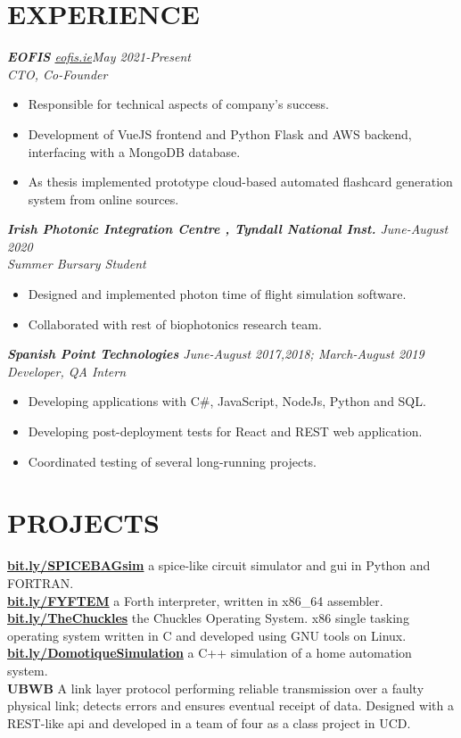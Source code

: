 \documentclass[sectionsleft,centered,10pt]{res}
\let\oldhref\href
\renewcommand{\href}[2]{\oldhref{#1}{\textbf{#2}}}
\begin{document}
\begin{resume}
\section{EXPERIENCE}
{\sl\textbf{EOFIS} \hspace{0.5cm}\oldhref{https://eofis.ie}{eofis.ie}\hfill May 2021-Present}\\
\emph{CTO, Co-Founder}
\begin{itemize}
	\item Responsible for technical aspects of company's success.
	\item Development of VueJS frontend and Python Flask and AWS backend, interfacing with a MongoDB database.
	\item As thesis implemented prototype cloud-based automated flashcard generation system from online sources.
\end{itemize}
{\sl\textbf{Irish Photonic Integration Centre , Tyndall National Inst.} \hfill June-August 2020}\\
\emph{Summer Bursary Student}
\begin{itemize}
	\item Designed and implemented photon time of flight simulation software.
	\item Collaborated with rest of biophotonics research team.
\end{itemize}
{\sl\textbf{Spanish Point Technologies} \hfill June-August 2017,2018; March-August 2019}\\
\emph{Developer, QA Intern}
\begin{itemize}
	\item Developing applications with C\#, JavaScript, NodeJs, Python and SQL.
	\item Developing post-deployment tests for React and REST web application.
	\item Coordinated testing of several long-running projects.
\end{itemize}

\section{PROJECTS}
\href{http://bit.ly/SPICEBAGsim}{bit.ly/SPICEBAGsim} a spice-like circuit simulator and gui in Python and FORTRAN.\\
\href{http://bit.ly/FYFTEM}{bit.ly/FYFTEM} a Forth interpreter, written in x86\_64 assembler.\\
\href{https://bit.ly/TheChuckles}{bit.ly/TheChuckles} the Chuckles Operating System. x86 single tasking operating system written in C and developed using GNU tools on Linux.\\
\href{http://bit.ly/DomotiqueSimulation}{bit.ly/DomotiqueSimulation} a C++ simulation of a home automation system.\\
\textbf{UBWB} A link layer protocol performing reliable transmission over a faulty physical link; detects errors and ensures eventual receipt of data. Designed with a REST-like api and developed in a team of four as a class project in UCD.\\


\end{resume}
\end{document}
